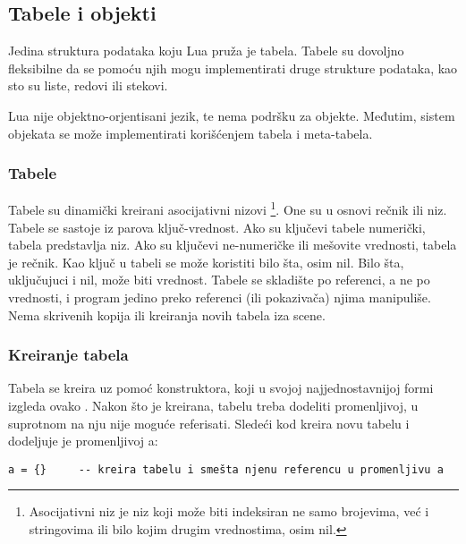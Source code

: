\documentclass[a4paper]{article}
\begin{document}
\subsection{Tabele i objekti}
Jedina struktura podataka koju Lua pruža je tabela. Tabele su dovoljno fleksibilne da se pomoću njih mogu implementirati druge strukture podataka, kao sto su liste, redovi ili stekovi.

Lua nije objektno-orjentisani jezik, te nema podršku za objekte. Međutim, sistem objekata se može implementirati korišćenjem tabela i meta-tabela.

\subsubsection{Tabele}
Tabele su dinamički kreirani asocijativni nizovi \footnote{Asocijativni niz je niz koji može biti indeksiran ne samo brojevima, već i stringovima ili bilo kojim drugim vrednostima, osim nil.}. One su u osnovi rečnik ili niz. Tabele se sastoje iz parova ključ-vrednost. Ako su ključevi tabele numerički, tabela predstavlja niz. Ako su ključevi ne-numeričke ili mešovite vrednosti, tabela je rečnik. Kao ključ u tabeli se može koristiti bilo šta, osim nil. Bilo šta, uključujuci i nil, može biti vrednost.
Tabele se skladište po referenci, a ne po vrednosti, i program jedino preko referenci (ili pokazivača) njima manipuliše. Nema skrivenih kopija ili kreiranja novih tabela iza scene.

\subsubsection{Kreiranje tabela}
Tabela se kreira uz pomoć konstruktora, koji u svojoj najjednostavnijoj formi izgleda ovako {}. Nakon što je kreirana, tabelu treba dodeliti promenljivoj, u suprotnom na nju nije moguće referisati. Sledeći kod kreira novu tabelu i dodeljuje je promenljivoj a:
\begin{verbatim}
a = {}     -- kreira tabelu i smešta njenu referencu u promenljivu a
\end{verbatim}
\end{document}
